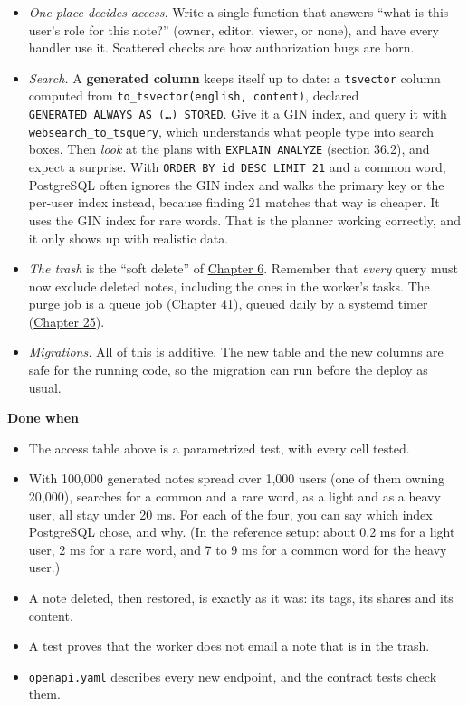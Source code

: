 \begin{itemize}
\tightlist
\item
  \emph{One place decides access.} Write a single function that answers ``what is this user's role for this note?'' (owner, editor, viewer, or none), and have every handler use it. Scattered checks are how authorization bugs are born.
\item
  \emph{Search.} A \textbf{generated column} keeps itself up to date: a \texttt{tsvector} column computed from \texttt{to\_}\allowbreak{}\texttt{tsvector(\textquotesingle{}english\textquotesingle{},}\allowbreak{}\texttt{\ content)}, declared \texttt{GENERATED\ ALWAYS\ AS\ (…)\ STORED}. Give it a GIN index, and query it with \texttt{websearch\_to\_tsquery}, which understands what people type into search boxes. Then \emph{look} at the plans with \texttt{EXPLAIN\ ANALYZE} (section 36.2), and expect a surprise. With \texttt{ORDER\ BY\ id\ DESC\ LIMIT\ 21} and a common word, PostgreSQL often ignores the GIN index and walks the primary key or the per-user index instead, because finding 21 matches that way is cheaper. It uses the GIN index for rare words. That is the planner working correctly, and it only shows up with realistic data.
\item
  \emph{The trash} is the ``soft delete'' of \hyperref[ch:06-local-dependencies]{Chapter 6}. Remember that \emph{every} query must now exclude deleted notes, including the ones in the worker's tasks. The purge job is a queue job (\hyperref[ch:41-event-driven-architecture]{Chapter 41}), queued daily by a systemd timer (\hyperref[ch:25-process-management]{Chapter 25}).
\item
  \emph{Migrations.} All of this is additive. The new table and the new columns are safe for the running code, so the migration can run before the deploy as usual.
\end{itemize}

\noindent{}\textbf{Done when}

\begin{itemize}
\item[$\square$]
  The access table above is a parametrized test, with every cell tested.
\item[$\square$]
  With 100,000 generated notes spread over 1,000 users (one of them owning 20,000), searches for a common and a rare word, as a light and as a heavy user, all stay under 20 ms. For each of the four, you can say which index PostgreSQL chose, and why. (In the reference setup: about 0.2 ms for a light user, 2 ms for a rare word, and 7 to 9 ms for a common word for the heavy user.)
\item[$\square$]
  A note deleted, then restored, is exactly as it was: its tags, its shares and its content.
\item[$\square$]
  A test proves that the worker does not email a note that is in the trash.
\item[$\square$]
  \texttt{openapi.yaml} describes every new endpoint, and the contract tests check them.
\end{itemize}

